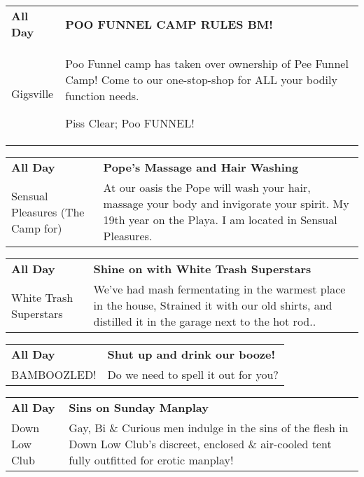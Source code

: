 \begin{tabular}{ p{1in} p{2.2in} }
    \textbf{All Day} & \textbf{POO FUNNEL CAMP RULES BM!} \\
    Gigsville \newline  & Poo Funnel camp has taken over ownership of Pee Funnel Camp! Come to our one-stop-shop for ALL your bodily function needs.

Piss Clear;
Poo FUNNEL! \\
    \hline 
\end{tabular}
    
\begin{tabular}{ p{1in} p{2.2in} }
    \textbf{All Day} & \textbf{Pope's Massage and Hair Washing} \\
    Sensual Pleasures (The Camp for) \newline  & At our oasis the Pope will wash your hair, massage your body and invigorate your spirit. My 19th year on the Playa. I am located in Sensual Pleasures. \\
    \hline 
\end{tabular}
    
\begin{tabular}{ p{1in} p{2.2in} }
    \textbf{All Day} & \textbf{Shine on with White Trash Superstars} \\
    White Trash Superstars \newline  & We've had mash fermentating in the warmest place in the house, Strained it with our old shirts, and distilled it in the garage next to the hot rod.. \\
    \hline 
\end{tabular}
    
\begin{tabular}{ p{1in} p{2.2in} }
    \textbf{All Day} & \textbf{Shut up and drink our booze!} \\
    BAMBOOZLED! \newline  & Do we need to spell it out for you? \\
    \hline 
\end{tabular}
    
\begin{tabular}{ p{1in} p{2.2in} }
    \textbf{All Day} & \textbf{Sins on Sunday Manplay} \\
    Down Low Club \newline  & Gay, Bi \& Curious men indulge in the sins of the flesh in Down Low Club's discreet, enclosed \& air-cooled tent fully outfitted for erotic manplay! \\
    \hline 
\end{tabular}
    
